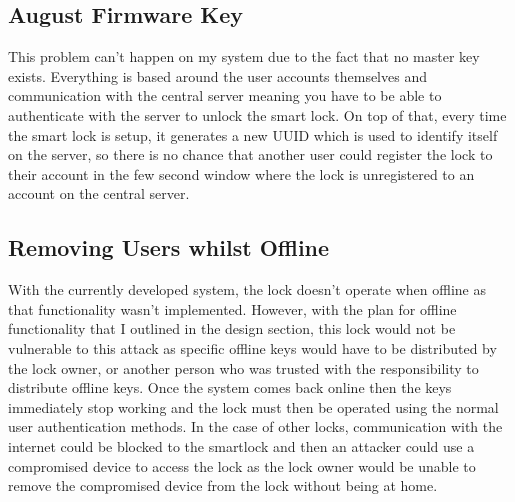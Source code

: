 \subsection{August Firmware Key}
This problem can't happen on my system due to the fact that no master key exists. Everything is based around the user accounts themselves and communication with the central server meaning you have to be able to authenticate with the server to unlock the smart lock. On top of that, every time the smart lock is setup, it generates a new UUID which is used to identify itself on the server, so there is no chance that another user could register the lock to their account in the few second window where the lock is unregistered to an account on the central server.

\subsection{Removing Users whilst Offline}
With the currently developed system, the lock doesn't operate when offline as that functionality wasn't implemented. However, with the plan for offline functionality that I outlined in the design section, this lock would not be vulnerable to this attack as specific offline keys would have to be distributed by the lock owner, or another person who was trusted with the responsibility to distribute offline keys. Once the system comes back online then the keys immediately stop working and the lock must then be operated using the normal user authentication methods. In the case of other locks, communication with the internet could be blocked to the smartlock and then an attacker could use a compromised device to access the lock as the lock owner would be unable to remove the compromised device from the lock without being at home.